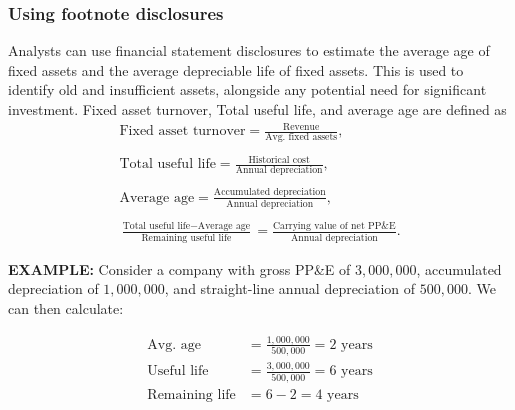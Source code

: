 \documentclass[../notes_compiled.tex]{subfiles}
\begin{document}
\subsubsection{Using footnote disclosures}
\begin{itemize}
\item Analysts can use financial statement disclosures to estimate the average age of fixed assets and the average depreciable life of fixed assets. This is used to identify old and insufficient assets, alongside any potential need for significant investment. Fixed asset turnover, Total useful life, and average age are defined as
\begin{gather}
\text{Fixed asset turnover} = \frac{\text{Revenue}}{\text{Avg. fixed assets}}, \\ \nonumber \\
\text{Total useful life} = \frac{\text{Historical cost}}{\text{Annual depreciation}}, \\\nonumber \\
\text{Average age} = \frac{\text{Accumulated depreciation}}{\text{Annual depreciation}}, \\ \nonumber \\
\frac{\text{Total useful life} - \text{Average age}}{\text{Remaining useful life}} = \frac{\text{Carrying value of net PP\&E}}{\text{Annual depreciation}}.
\end{gather}

{\color{RedViolet}
\item[] \textbf{EXAMPLE:} Consider a company with gross PP\&E of $3,000,000$, accumulated depreciation of $1,000,000$, and straight-line annual depreciation of $500,000$. We can then calculate:
}
{\color{RoyalBlue}
\begin{align*}
\text{Avg. age} &= \frac{1,000,000}{500,000} = \text{2 years} \\
\text{Useful life} &= \frac{3,000,000}{500,000} = \text{6 years} \\
\text{Remaining life} &= 6-2 = \text{4 years}
\end{align*}
}

\end{itemize}
\end{document}
